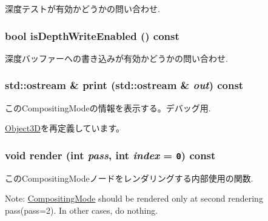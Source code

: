 深度テストが有効かどうかの問い合わせ. \hypertarget{classm3g_1_1CompositingMode_0ee4c812abd4a99e0373158d36dc45d9}{
\subsubsection[{isDepthWriteEnabled}]{\setlength{\rightskip}{0pt plus 5cm}bool isDepthWriteEnabled () const}}
\label{classm3g_1_1CompositingMode_0ee4c812abd4a99e0373158d36dc45d9}


深度バッファーへの書き込みが有効かどうかの問い合わせ. \hypertarget{classm3g_1_1CompositingMode_6fea17fa1532df3794f8cb39cb4f911f}{
\subsubsection[{print}]{\setlength{\rightskip}{0pt plus 5cm}std::ostream \& print (std::ostream \& {\em out}) const}}
\label{classm3g_1_1CompositingMode_6fea17fa1532df3794f8cb39cb4f911f}


このCompositingModeの情報を表示する。デバッグ用. 

\hyperlink{classm3g_1_1Object3D_6fea17fa1532df3794f8cb39cb4f911f}{Object3D}を再定義しています。\hypertarget{classm3g_1_1CompositingMode_1efcb1973989d9963d5bd6d03065d389}{
\subsubsection[{render}]{\setlength{\rightskip}{0pt plus 5cm}void render (int {\em pass}, \/  int {\em index} = {\tt 0}) const}}
\label{classm3g_1_1CompositingMode_1efcb1973989d9963d5bd6d03065d389}


このCompositingModeノードをレンダリングする内部使用の関数.

Note: \hyperlink{classm3g_1_1CompositingMode}{CompositingMode} should be rendered only at second rendering pass(pass=2). In other cases, do nothing. 

